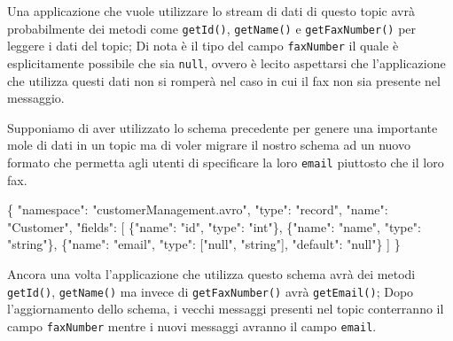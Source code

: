 \documentclass[]{article}
\newenvironment{Shaded}{}{}
\newcommand{\DataTypeTok}[1]{\textcolor[rgb]{0.56,0.13,0.00}{#1}}
\newcommand{\StringTok}[1]{\textcolor[rgb]{0.25,0.44,0.63}{#1}}
\newcommand{\OtherTok}[1]{\textcolor[rgb]{0.00,0.44,0.13}{#1}}
\newcommand{\FunctionTok}[1]{\textcolor[rgb]{0.02,0.16,0.49}{#1}}
\begin{document}
\normalsize

Una applicazione che vuole utilizzare lo stream di dati di questo topic
avrà probabilmente dei metodi come \texttt{getId()}, \texttt{getName()}
e \texttt{getFaxNumber()} per leggere i dati del topic; Di nota è il
tipo del campo \texttt{faxNumber} il quale è esplicitamente possibile
che sia \texttt{null}, ovvero è lecito aspettarsi che l'applicazione che
utilizza questi dati non si romperà nel caso in cui il fax non sia
presente nel messaggio.

Supponiamo di aver utilizzato lo schema precedente per genere una
importante mole di dati in un topic ma di voler migrare il nostro schema
ad un nuovo formato che permetta agli utenti di specificare la loro
\texttt{email} piuttosto che il loro fax.

\small

\begin{Shaded}
\begin{Highlighting}[]
\FunctionTok{\{}
    \DataTypeTok{"namespace"}\FunctionTok{:} \StringTok{"customerManagement.avro"}\FunctionTok{,}
    \DataTypeTok{"type"}\FunctionTok{:} \StringTok{"record"}\FunctionTok{,}
    \DataTypeTok{"name"}\FunctionTok{:} \StringTok{"Customer"}\FunctionTok{,}
    \DataTypeTok{"fields"}\FunctionTok{:} \OtherTok{[}
         \FunctionTok{\{}\DataTypeTok{"name"}\FunctionTok{:} \StringTok{"id"}\FunctionTok{,} \DataTypeTok{"type"}\FunctionTok{:} \StringTok{"int"}\FunctionTok{\}}\OtherTok{,}
         \FunctionTok{\{}\DataTypeTok{"name"}\FunctionTok{:} \StringTok{"name"}\FunctionTok{,}  \DataTypeTok{"type"}\FunctionTok{:} \StringTok{"string"}\FunctionTok{\}}\OtherTok{,}
         \FunctionTok{\{}\DataTypeTok{"name"}\FunctionTok{:} \StringTok{"email"}\FunctionTok{,} \DataTypeTok{"type"}\FunctionTok{:} \OtherTok{[}\StringTok{"null"}\OtherTok{,} \StringTok{"string"}\OtherTok{]}\FunctionTok{,} \DataTypeTok{"default"}\FunctionTok{:} \StringTok{"null"}\FunctionTok{\}}
    \OtherTok{]} 
\FunctionTok{\}}
\end{Highlighting}
\end{Shaded}

\normalsize

Ancora una volta l'applicazione che utilizza questo schema avrà dei
metodi \texttt{getId()}, \texttt{getName()} ma invece di
\texttt{getFaxNumber()} avrà \texttt{getEmail()}; Dopo l'aggiornamento
dello schema, i vecchi messaggi presenti nel topic conterranno il campo
\texttt{faxNumber} mentre i nuovi messaggi avranno il campo
\texttt{email}.
\end{document}
